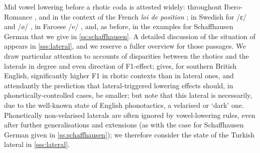Mid vowel lowering before a rhotic coda is attested widely: throughout Ibero-Romance \citep{Bradley2010}, and in the context of the French \textit{loi de position} \citep{Storme2017}; in Swedish for /ɛ/ and /ø/ \citep{Riad2014}, in Faroese /e/ \citep{Arnason1999}, and, as before, in the examples for Schaffhausen German that we give in \cref{ss:schaffhausen}.
A detailed discussion of the situation of  appears in \cref{sss:lateral}, and we reserve a fuller overview for those passages. We draw particular attention to accounts of disparities between the rhotics and the laterals in degree and even direction of F1-effect; \cite{West1999} gives, for southern British English, significantly higher F1 in rhotic contexts than in lateral ones, and attendantly the prediction that lateral-triggered lowering effects should, in phonetically-controlled cases, be smaller; but note that this lateral is necessarily, due to the well-known state of English phonotactics, a velarised or `dark' one. Phonetically non-velarised laterals are often ignored by vowel-lowering rules, even after further generalisations and extensions (as with the case for Schaffhausen German given in \cref{ss:schaffhausen}); we therefore consider the state of the Turkish lateral in \cref{sss:lateral}.


